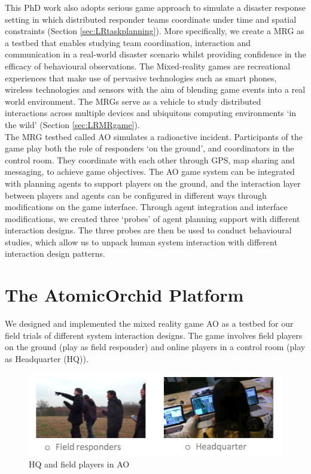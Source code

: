 This PhD work also adopts serious game approach to simulate a disaster response setting in which distributed responder teams coordinate under time and spatial constraints (Section \ref{sec:LRtaskplanning}). More specifically, we create a \acf{MRG} as a testbed that enables studying team coordination, interaction and communication in a real-world disaster scenario whilst providing confidence in the efficacy of behavioural observations. The Mixed-reality games are recreational experiences that make use of pervasive technologies such as smart phones, wireless technologies and sensors with the aim of blending game events into a real world environment. The \ac{MRG}s serve as a vehicle to study distributed interactions across multiple devices and ubiquitous computing environments `in the wild' (Section \ref{sec:LRMRgame}).\\

The \ac{MRG} testbed called \acf{AO} simulates a radioactive incident. Participants of the game play both the role of responders `on the ground', and coordinators in the control room. They coordinate with each other through GPS, map sharing and messaging, to achieve game objectives. The \ac{AO} game system can be integrated with planning agents to support players on the ground, and the interaction layer between players and agents can be configured in different ways through modifications on the game interface. Through agent integration and interface modifications, we created three `probes' of agent planning support with different interaction designs. The three probes are then be used to conduct behavioural studies, which allow us to unpack human system interaction with different interaction design patterns.\\

\section{The AtomicOrchid Platform}\label{sec:AOdescription}
We designed and implemented the mixed reality game \acf{AO} as a testbed for our field trials of different system interaction designs. The game involves field players on the ground (play as field responder) and online players in a control room (play as Headquarter (HQ)).

\begin{figure}[h]
  \centering
  \includegraphics[width=1\textwidth]{img/approach/GameComponents}
  \caption{HQ and field players in AO}
  \label{fig:AOroles}
\end{figure}

